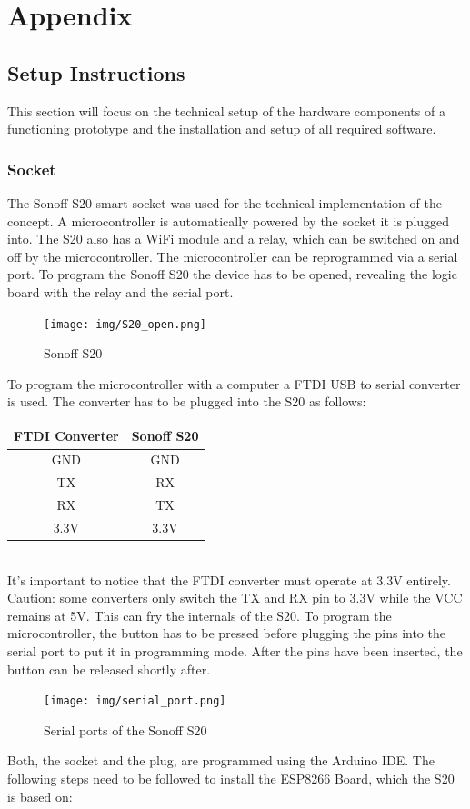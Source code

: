 \section{Appendix}
\label{sec:appendix}
\subsection{Setup Instructions}
This section will focus on the technical setup of the hardware components of a functioning prototype and the installation and setup of all required software.
\\
\subsubsection{Socket}
The Sonoff S20 smart socket was used for the technical implementation of the concept.
A microcontroller is automatically powered by the socket it is plugged into.
The S20 also has a WiFi module and a relay, which can be switched on and off by the microcontroller.
The microcontroller can be reprogrammed via a serial port.
To program the Sonoff S20 the device has to be opened, revealing the logic board with the relay and the serial port.
\\
\begin{figure}[H]
    \texttt{[image: img/S20\_open.png]}
    \caption{Sonoff S20}
    \label{fig:S20}
\end{figure}
\newpage
To program the microcontroller with a computer a FTDI USB to serial converter is used.
The converter has to be plugged into the S20 as follows:
\\
\begin{center}
    \begin{tabular} { |c|c| }
        \hline
        FTDI Converter & Sonoff S20 \\
        \hline\hline
        GND & GND \\
        \hline
        TX & RX \\
        \hline
        RX & TX \\
        \hline
        3.3V & 3.3V \\
        \hline
    \end{tabular}
    \label{tab:ftdi}
\end{center}
\leavevmode
\\
It's important to notice that the FTDI converter must operate at 3.3V entirely.
Caution: some converters only switch the TX and RX pin to 3.3V while the VCC remains at 5V.
This can fry the internals of the S20.
To program the microcontroller, the button has to be pressed before plugging the pins into the serial port to put it in programming mode.
After the pins have been inserted, the button can be released shortly after.
\\
\begin{figure}[H]
    \texttt{[image: img/serial\_port.png]}
    \caption{Serial ports of the Sonoff S20}
    \label{fig:S20_serial}
\end{figure}
\newpage
Both, the socket and the plug, are programmed using the Arduino IDE.
The following steps need to be followed to install the ESP8266 Board, which the S20 is based on:

